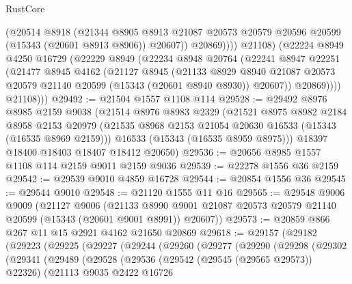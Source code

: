 \begin{lexlean}{RustCore}
\begin{coremodule}
                  (@20514
                    @8918
                    (@21344
                      @8905
                      @8913
                      @21087
                      @20573
                      @20579
                      @20596
                      @20599
                      (@15343 (@20601 @8913 @8906))
                      @20607))
                  @20869))))
          @21108)
        (@22224
          @8949
          @4250
          @16729
          (@22229
            @8949
            (@22234
              @8948
              @20764
              (@22241
                @8947
                @22251
                (@21477
                  @8945
                  @4162
                  (@21127
                    @8945
                    (@21133
                      @8929
                      @8940
                      @21087
                      @20573
                      @20579
                      @21140
                      @20599
                      (@15343 (@20601 @8940 @8930))
                      @20607))
                  @20869))))
          @21108)))
@29492 := @21504 @1557 @1108 @114
@29528 := @29492
    @8976
    @8985
    @2159
    @9038
    (@21514
      @8976
      @8983
      @2329
      (@21521
        @8975
        @8982
        @2184
        @8958
        @2153
        @20979
        (@21535 @8968 @2153 @21054 @20630 @16533 (@15343 (@16535 @8969 @2159)))
        @16533
        (@15343 (@16535 @8959 @8975)))
      @18397
      @18400
      @18403
      @18407
      @18412
      @20650)
@29536 := @20656 @8985 @1557 @1108 @114 @2159 @9011 @2159 @9036
@29539 := @22278 @1556 @36 @2159
@29542 := @29539 @9010 @4859 @16728
@29544 := @20854 @1556 @36
@29545 := @29544 @9010
@29548 := @21120 @1555 @11 @16
@29565 := @29548
    @9006
    @9009
    (@21127
      @9006
      (@21133 @8990 @9001 @21087 @20573 @20579 @21140 @20599 (@15343 (@20601 @9001 @8991)) @20607))
@29573 := @20859 @866 @267 @11 @15 @2921 @4162 @21650 @20869
@29618 := @29157
    (@29182
      (@29223
        (@29225
          (@29227
            (@29244
              (@29260
                (@29277
                  (@29290
                    (@29298
                      (@29302
                        (@29341
                          (@29489
                            (@29528
                              (@29536
                                (@29542 (@29545 (@29565 @29573)) @22326)
                                (@21113
                                  @9035
                                  @2422
                                  @16726

\end{coremodule}
\end{lexlean}
